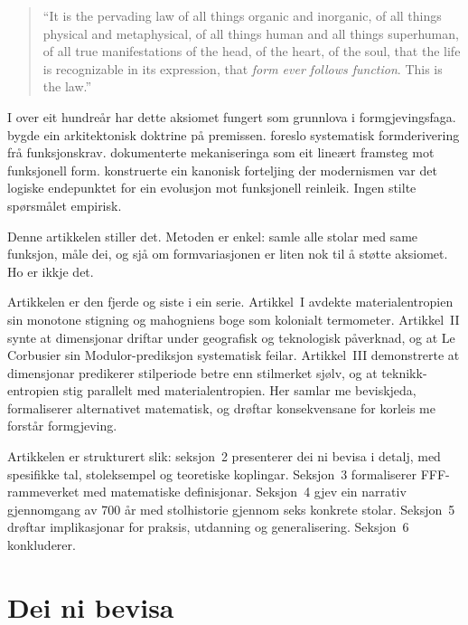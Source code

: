 \documentclass[10pt, a4paper, twocolumn]{article}
\begin{document}
\begin{quote}
``It is the pervading law of all things organic and inorganic, of all things physical and metaphysical, of all things human and all things superhuman, of all true manifestations of the head, of the heart, of the soul, that the life is recognizable in its expression, that \emph{form ever follows function}. This is the law.'' \citep{sullivan1896}
\end{quote}

I over eit hundreår har dette aksiomet fungert som grunnlova i formgjevingsfaga. \citet{lecorbusier1923} bygde ein arkitektonisk doktrine på premissen. \citet{alexander1964} foreslo systematisk formderivering frå funksjonskrav. \citet{giedion1948} dokumenterte mekaniseringa som eit lineært framsteg mot funksjonell form. \citet{pevsner1936} konstruerte ein kanonisk forteljing der modernismen var det logiske endepunktet for ein evolusjon mot funksjonell reinleik. Ingen stilte spørsmålet empirisk.

Denne artikkelen stiller det. Metoden er enkel: samle alle stolar med same funksjon, måle dei, og sjå om formvariasjonen er liten nok til å støtte aksiomet. Ho er ikkje det.

Artikkelen er den fjerde og siste i ein serie. Artikkel~I avdekte materialentropien sin monotone stigning og mahogniens boge som kolonialt termometer. Artikkel~II synte at dimensjonar driftar under geografisk og teknologisk påverknad, og at Le Corbusier sin Modulor-prediksjon systematisk feilar. Artikkel~III demonstrerte at dimensjonar predikerer stilperiode betre enn stilmerket sjølv, og at teknikk-entropien stig parallelt med materialentropien. Her samlar me beviskjeda, formaliserer alternativet matematisk, og drøftar konsekvensane for korleis me forstår formgjeving.

Artikkelen er strukturert slik: seksjon~2 presenterer dei ni bevisa i detalj, med spesifikke tal, stoleksempel og teoretiske koplingar. Seksjon~3 formaliserer FFF-rammeverket med matematiske definisjonar. Seksjon~4 gjev ein narrativ gjennomgang av 700 år med stolhistorie gjennom seks konkrete stolar. Seksjon~5 drøftar implikasjonar for praksis, utdanning og generalisering. Seksjon~6 konkluderer.


\section{Dei ni bevisa}
\end{document}
